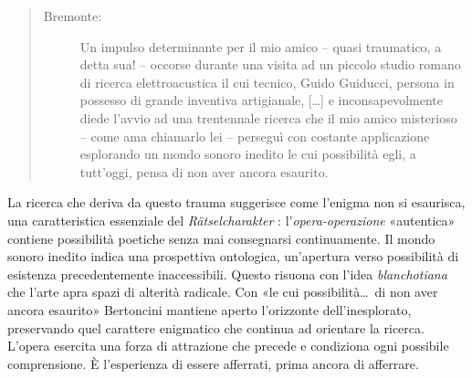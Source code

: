 \begin{quote}
  \begin{sf}
    \small
    \begin{description}
      \item[Bremonte:] %
      Un impulso determinante per il mio amico – quasi traumatico, a detta sua! –
      occorse durante una visita ad un piccolo studio romano di ricerca
      elettroacustica il cui tecnico, Guido Guiducci, persona in possesso di
      grande inventiva artigianale,%
      [\ldots] e inconsapevolmente diede l’avvio ad una trentennale ricerca che il mio
      amico misterioso – come ama chiamarlo lei – perseguì con costante
      applicazione esplorando un mondo sonoro inedito le cui possibilità egli, a
      tutt’oggi, pensa di non aver ancora esaurito.
    \end{description}
  \end{sf}
\end{quote}

La ricerca che deriva da questo trauma suggerisce come l'enigma non si esaurisca,
una caratteristica essenziale del \emph{Rätselcharakter} \cite{adorno1970}: l'\emph{opera-operazione}
«autentica» contiene possibilità poetiche senza mai consegnarsi continuamente.
Il mondo sonoro  inedito indica una prospettiva ontologica, un'apertura verso
possibilità di esistenza precedentemente inaccessibili. Questo risuona con
l'idea \emph{blanchotiana} che l'arte apra spazi di alterità radicale.
Con «le cui possibilità\ldots~di non aver ancora esaurito» Bertoncini mantiene
aperto l'orizzonte dell'inesplorato, preservando quel carattere enigmatico che
continua ad orientare la ricerca.
L'opera esercita una forza di attrazione che precede e condiziona ogni possibile
comprensione. È l'esperienza di essere afferrati, prima ancora di afferrare.

